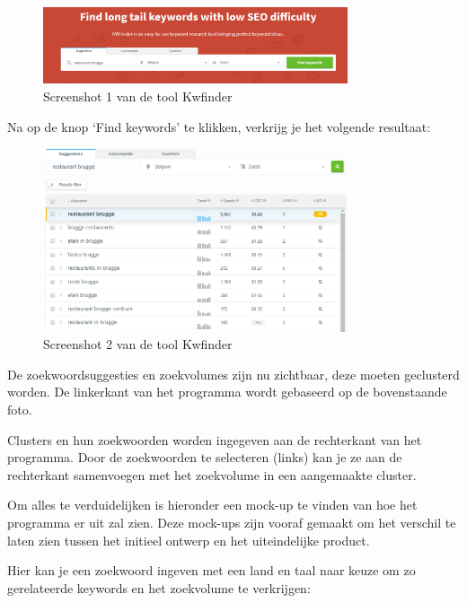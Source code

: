 \begin{figure}[h!]
\centering
\includegraphics[width=0.8\textwidth]{img/kwfindervoorbeeld.png}
\caption{Screenshot 1 van de tool Kwfinder}
\end{figure}

Na op de knop ‘Find keywords’ te klikken, verkrijg je het volgende resultaat: 

\begin{figure}[h!]
\centering
\includegraphics[width=0.8\textwidth]{img/kwfindervoorbeeld2.png}
\caption{Screenshot 2 van de tool Kwfinder}
\end{figure}

De zoekwoordsuggesties en zoekvolumes zijn nu zichtbaar, deze moeten geclusterd worden. De linkerkant van het programma wordt gebaseerd op de bovenstaande foto. 

Clusters en hun zoekwoorden worden ingegeven aan de rechterkant van het programma. Door de zoekwoorden te selecteren (links) kan je ze aan de rechterkant samenvoegen met het zoekvolume in een aangemaakte cluster. 

Om alles te verduidelijken is hieronder een mock-up te vinden van hoe het programma er uit zal zien. Deze mock-ups zijn vooraf gemaakt om het verschil te laten zien tussen het initieel ontwerp en het uiteindelijke product. 

\newpage
Hier kan je een zoekwoord ingeven met een land en taal naar keuze om zo gerelateerde keywords en het zoekvolume te verkrijgen: 

